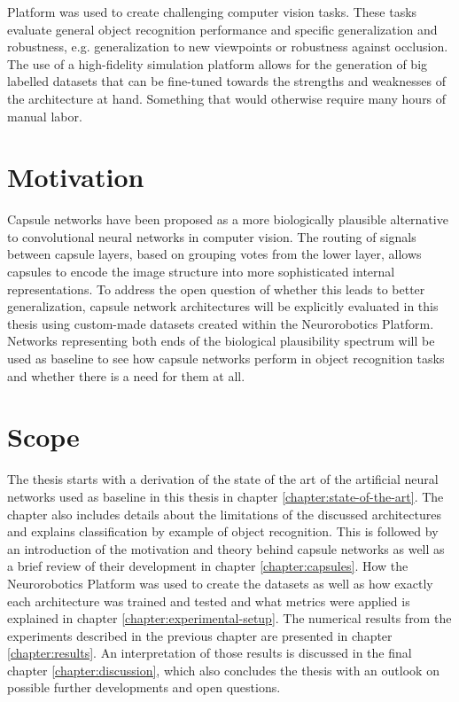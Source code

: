 Platform was used to create challenging computer vision tasks. These tasks evaluate general object recognition performance and specific generalization and robustness, e.g. generalization to new viewpoints or robustness against occlusion. The use of a high-fidelity simulation platform allows for the generation of big labelled datasets that can be fine-tuned towards the strengths and weaknesses of the architecture at hand. Something that would otherwise require many hours of manual labor.
\section{Motivation}
Capsule networks have been proposed as a more biologically plausible alternative to convolutional neural networks in computer vision. The routing of signals between capsule layers, based on grouping votes from the lower layer, allows capsules to encode the image structure into more sophisticated internal representations. To address the open question of whether this leads to better generalization, capsule network architectures will be explicitly evaluated in this thesis using custom-made datasets created within the Neurorobotics Platform. Networks representing both ends of the biological plausibility spectrum will be used as baseline to see how capsule networks perform in object recognition tasks and whether there is a need for them at all.
\section{Scope}
The thesis starts with a derivation of the state of the art of the artificial neural networks used as baseline in this thesis in chapter \ref{chapter:state-of-the-art}. The chapter also includes details about the limitations of the discussed architectures and explains classification by example of object recognition. This is followed by an introduction of the motivation and theory behind capsule networks as well as a brief review of their development in chapter \ref{chapter:capsules}. How the Neurorobotics Platform was used to create the datasets as well as how exactly each architecture was trained and tested and what metrics were applied is explained in chapter \ref{chapter:experimental-setup}. The numerical results from the experiments described in the previous chapter are presented in chapter \ref{chapter:results}. An interpretation of those results is discussed in the final chapter \ref{chapter:discussion}, which also concludes the thesis with an outlook on possible further developments and open questions.
